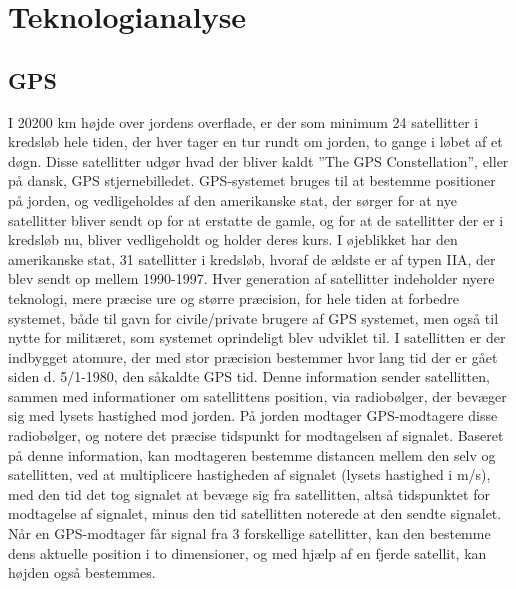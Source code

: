 \chapter{Teknologianalyse} \label{sec:teknologianalyse}


\section{GPS}

I 20200 km højde over jordens overflade, er der som minimum 24 satellitter i kredsløb hele tiden, der hver tager en tur rundt om jorden, to gange i løbet af et døgn. Disse satellitter udgør hvad der bliver kaldt ”The GPS Constellation”, eller på dansk, GPS stjernebilledet.  GPS-systemet bruges til at bestemme positioner på jorden, og vedligeholdes af den amerikanske stat, der sørger for at nye satellitter bliver sendt op for at erstatte de gamle, og for at de satellitter der er i kredsløb nu, bliver vedligeholdt og holder deres kurs. I øjeblikket har den amerikanske stat, 31 satellitter i kredsløb, hvoraf de ældste er af typen IIA, der blev sendt op mellem 1990-1997. Hver generation af satellitter indeholder nyere teknologi, mere præcise ure og større præcision, for hele tiden at forbedre systemet, både til gavn for civile/private brugere af GPS systemet, men også til nytte for militæret, som systemet oprindeligt blev udviklet til. 
I satellitten er der indbygget atomure, der med stor præcision bestemmer hvor lang tid der er gået siden d. 5/1-1980, den såkaldte GPS tid. Denne information sender satellitten, sammen med informationer om satellittens position, via radiobølger, der bevæger sig med lysets hastighed mod jorden. På jorden modtager GPS-modtagere disse radiobølger, og notere det præcise tidspunkt for modtagelsen af signalet. Baseret på denne information, kan modtageren bestemme distancen mellem den selv og satellitten, ved at multiplicere hastigheden af signalet (lysets hastighed i m/s), med den tid det tog signalet at bevæge sig fra satellitten, altså tidspunktet for modtagelse af signalet, minus den tid satellitten noterede at den sendte signalet. Når en GPS-modtager får signal fra 3 forskellige satellitter, kan den bestemme dens aktuelle position i to dimensioner, og med hjælp af en fjerde satellit, kan højden også bestemmes.
